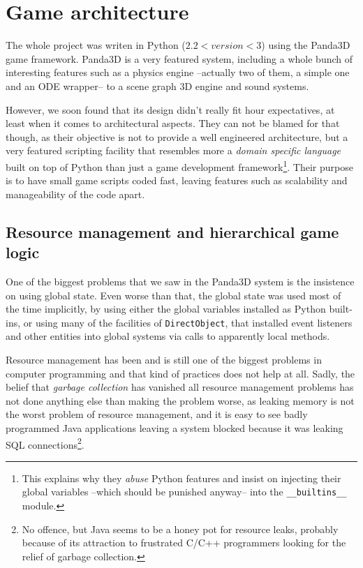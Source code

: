 \documentclass[a4paper,10pt]{article}
\begin{document}
\section{Game architecture}

The whole project was writen in Python ($2.2 < version < 3$) using the
Panda3D\cite{panda} game framework. Panda3D is a very featured system,
including a whole bunch of interesting features such as a physics
engine --actually two of them, a simple one and an ODE\cite{ode}
wrapper-- to a scene graph 3D engine and sound systems.

However, we soon found that its design didn't really fit hour
expectatives, at least when it comes to architectural aspects. They
can not be blamed for that though, as their objective is not to
provide a well engineered architecture, but a very featured scripting
facility that resembles more a \emph{domain specific language} built
on top of Python than just a game development framework\footnote{This
  explains why they \emph{abuse} Python features and insist on
  injecting their global variables --which should be punished anyway--
into the \texttt{\_\_builtins\_\_} module.}. Their purpose
is to have small game scripts coded fast, leaving features such as
scalability and manageability of the code apart.

\subsection{Resource management and hierarchical game logic}

One of the biggest problems that we saw in the Panda3D system is the
insistence on using global state. Even worse than that, the global
state was used most of the time implicitly, by using either the global
variables installed as Python built-ins, or using many of the
facilities of \texttt{DirectObject}, that installed event listeners
and other entities into global systems via calls to apparently local
methods.

Resource management has been and is still one of the biggest problems
in computer programming and that kind of practices does not help at
all. Sadly, the belief that \emph{garbage collection} has vanished all
resource management problems has not done anything else than making
the problem worse, as leaking memory is not the worst problem of
resource management, and it is easy to see badly programmed Java
applications leaving a system blocked because it was leaking SQL
connections\footnote{No offence, but Java seems to be a honey pot for
  resource leaks, probably because of its attraction to frustrated
  C/C++ programmers looking for the relief of garbage collection.}.
\end{document}
